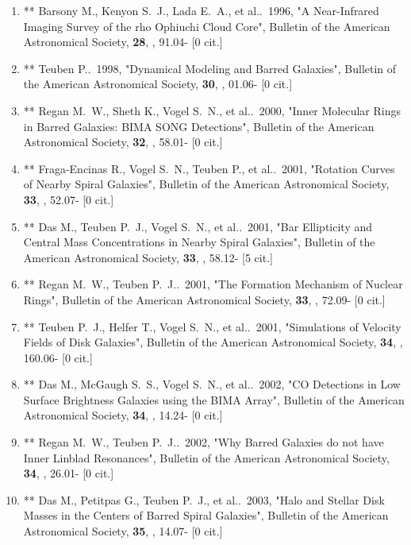 \documentclass[11pt,letterpaper]{article}
\begin{document}
\begin{enumerate}[resume,label=\textbf{\arabic*}.]
\item **
  Barsony M., Kenyon S.~J., Lada E.~A., et al..\  1996,  "A 
Near-Infrared Imaging Survey of the rho Ophiuchi Cloud Core", Bulletin of 
the American Astronomical Society,  {\bf 28}, , 91.04- [0 cit.] %

\item  **
  Teuben P..\  1998,  "Dynamical Modeling and Barred Galaxies", 
Bulletin of the American Astronomical Society,  {\bf 30}, , 01.06- [0 cit.] 
\item   **
  Regan M.~W., Sheth K., Vogel S.~N., et al..\  2000,  "Inner 
Molecular Rings in Barred Galaxies: BIMA SONG Detections", Bulletin of the 
American Astronomical Society,  {\bf 32}, , 58.01- [0 cit.] %


\item  **
  Fraga-Encinas R., Vogel S.~N., Teuben P., et al..\  2001,  "Rotation 
Curves of Nearby Spiral Galaxies", Bulletin of the American Astronomical 
Society,  {\bf 33}, , 52.07- [0 cit.] %

\item  **
  Das M., Teuben P.~J., Vogel S.~N., et al..\  2001,  "Bar Ellipticity 
and Central Mass Concentrations in Nearby Spiral Galaxies", Bulletin of the 
American Astronomical Society,  {\bf 33}, , 58.12- [5 cit.] %

\item  **
  Regan M.~W., Teuben P.~J..\  2001,  "The Formation Mechanism of 
Nuclear Rings", Bulletin of the American Astronomical Society,  {\bf 33}, , 
72.09- [0 cit.] %

\item   **
  Teuben P.~J., Helfer T., Vogel S.~N., et al..\  2001,  "Simulations 
of Velocity Fields of Disk Galaxies", Bulletin of the American Astronomical 
Society,  {\bf 34}, , 160.06- [0 cit.] %

\item   **
  Das M., McGaugh S.~S., Vogel S.~N., et al..\  2002,  "CO Detections 
in Low Surface Brightness Galaxies using the BIMA Array", Bulletin of the 
American Astronomical Society,  {\bf 34}, , 14.24- [0 cit.] %

\item   **
  Regan M.~W., Teuben P.~J..\  2002,  "Why Barred Galaxies do not have 
Inner Linblad Resonances", Bulletin of the American Astronomical Society,  
{\bf 34}, , 26.01- [0 cit.] %


\item   **
  Das M., Petitpas G., Teuben P.~J., et al..\  2003,  "Halo and 
Stellar Disk Masses in the Centers of Barred Spiral Galaxies", Bulletin of 
the American Astronomical Society,  {\bf 35}, , 14.07- [0 cit.] %


\end{enumerate}
\end{document}
